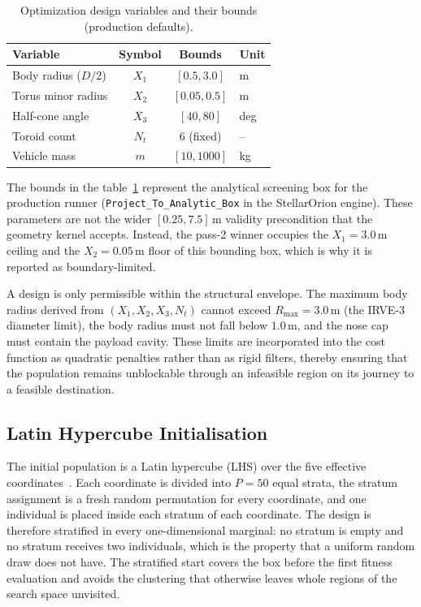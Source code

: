 \begin{table}[H]
    \centering
    \caption{Optimization design variables and their bounds (production defaults).}
    \label{tab:design_variables}
    \begin{tabularx}{\textwidth}{|>{\RaggedRight\arraybackslash}p{}|c|c|X|}
        \hline
        \textbf{Variable} & \textbf{Symbol} & \textbf{Bounds} & \textbf{Unit} \\ \hline
        Body radius ($D/2$) & $X_1$ & $[0.5, 3.0]$ & m \\ \hline
        Torus minor radius & $X_2$ & $[0.05, 0.5]$ & m \\ \hline
        Half-cone angle & $X_3$ & $[40, 80]$ & deg \\ \hline
        Toroid count & $N_t$ & 6 (fixed) & -- \\ \hline
        Vehicle mass & $m$ & $[10, 1000]$ & kg \\ \hline
    \end{tabularx}
\end{table}
The bounds in the table~\ref{tab:design_variables} represent the analytical screening box for the production runner (\texttt{Project\_To\_Analytic\_Box} in the StellarOrion engine). These parameters are not the wider $[0.25, 7.5]$\,m validity precondition that the geometry kernel accepts. Instead, the pass-2 winner occupies the $X_1=3.0$\,m ceiling and the $X_2=0.05$\,m floor of this bounding box, which is why it is reported as boundary-limited.

A design is only permissible within the structural envelope. The maximum body radius derived from $(X_1,X_2,X_3,N_t)$ cannot exceed $R_{\max} = 3.0$\,m (the IRVE-3 diameter limit), the body radius must not fall below $1.0$\,m, and the nose cap must contain the payload cavity. These limits are incorporated into the cost function as quadratic penalties rather than as rigid filters, thereby ensuring that the population remains unblockable through an infeasible region on its journey to a feasible destination.

\subsection{Latin Hypercube Initialisation}
The initial population is a Latin hypercube (LHS) over the five effective coordinates~\cite{mckay1979lhs}. Each coordinate is divided into $P=50$ equal strata, the stratum assignment is a fresh random permutation for every coordinate, and one individual is placed inside each stratum of each coordinate. The design is therefore stratified in every one-dimensional marginal: no stratum is empty and no stratum receives two individuals, which is the property that a uniform random draw does not have. The stratified start covers the box before the first fitness evaluation and avoids the clustering that otherwise leaves whole regions of the search space unvisited.

